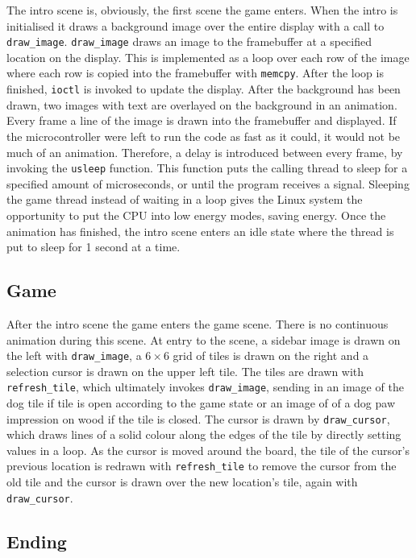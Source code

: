 The intro scene is, obviously, the first scene the game enters. When the intro
is initialised it draws a background image over the entire display with a call
to \texttt{draw\_image}. \texttt{draw\_image} draws an image to the framebuffer
at a specified location on the display. This is implemented as a loop over each
row of the image where each row is copied into the framebuffer with
\texttt{memcpy}. After the loop is finished, \texttt{ioctl} is invoked to update
the display. After the background has been drawn, two images with text are
overlayed on the background in an animation. Every frame a line of the image is
drawn into the framebuffer and displayed. If the microcontroller were left to
run the code as fast as it could, it would not be much of an animation.
Therefore, a delay is introduced between every frame, by invoking the
\texttt{usleep} function. This function puts the calling thread to sleep for a
specified amount of microseconds, or until the program receives a signal.
Sleeping the game thread instead of waiting in a loop gives the Linux system the
opportunity to put the CPU into low energy modes, saving energy. Once the
animation has finished, the intro scene enters an idle state where the thread is
put to sleep for 1 second at a time.

\subsection{Game}

After the intro scene the game enters the game scene. There is no continuous
animation during this scene. At entry to the scene, a sidebar image is drawn on
the left with \texttt{draw\_image}, a \(6 \times 6\) grid of tiles is drawn on
the right and a selection cursor is drawn on the upper left tile. The tiles are
drawn with \texttt{refresh\_tile}, which ultimately invokes
\texttt{draw\_image}, sending in an image of the dog tile if tile is open
according to the game state or an image of of a dog paw impression on wood if
the tile is closed. The cursor is drawn by \texttt{draw\_cursor}, which draws
lines of a solid colour along the edges of the tile by directly setting values
in a loop. As the cursor is moved around the board, the tile of the cursor's
previous location is redrawn with \texttt{refresh\_tile} to remove the cursor
from the old tile and the cursor is drawn over the new location's tile, again
with \texttt{draw\_cursor}.

\subsection{Ending}

